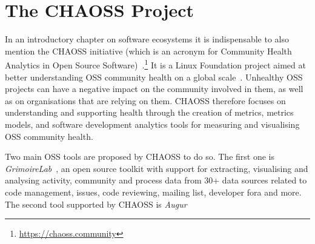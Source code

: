 \cite{Lomio2022}

\section{The CHAOSS Project}
\label{INT:sec:chaoss}

In an introductory chapter on software ecosystems it is indispensable to also mention the CHAOSS initiative (which is an acronym for Community Health Analytics in Open Source Software)~\cite{Goggins2021CHAOSS}.\footnote{\url{https://chaoss.community}}
It is a Linux Foundation project aimed at better understanding OSS community health on a global scale~\cite{Goggins2021}.
Unhealthy OSS projects can have a negative impact on the community involved in them, as well as on organisations that are relying on them.
CHAOSS therefore focuses on understanding and supporting health through the creation of metrics, metrics models, and software development analytics tools for measuring and visualising OSS community health.

Two main OSS tools are proposed by CHAOSS to do so.
%
The first one is \emph{GrimoireLab}~\cite{GrimoireLab2021}, an open source toolkit with support for extracting, visualising and analysing activity, community and process data from 30+ data sources related to code management, issues, code reviewing, mailing list, developer fora and more.
%
The second tool supported by CHAOSS is \emph{Augur}~\cite{}





